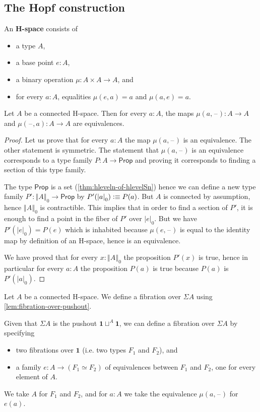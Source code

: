 \documentclass[10pt,a4paper]{article}
\providecommand{\index}[1]{}
\newcommand{\defeq}{\vcentcolon\equiv}  %
\newcommand{\define}[1]{\textbf{#1}}
\newcommand{\eqv}[2]{\ensuremath{#1 \simeq #2}\xspace}
\newcommand{\prop}{\ensuremath{\mathsf{Prop}}\xspace}
\newcommand{\trunc}[2]{\mathopen{}\left\Vert #2\right\Vert_{#1}\mathclose{}}
\newcommand{\tproj}[3][]{\mathopen{}\left|#3\right|_{#2}^{#1}\mathclose{}}
\newcommand{\unit}{\ensuremath{\mathbf{1}}\xspace}
\newcommand{\susp}{\Sigma}
\newcommand{\blank}{\mathord{\hspace{1pt}\text{--}\hspace{1pt}}}
\theoremstyle{definition}
\theoremstyle{remark}
\numberwithin{equation}{section}
\newcommand{\indexdef}[1]{\index{#1|defstyle}}   %
\begin{document}
\subsection{The Hopf construction}

\begin{defn}
  An \define{H-space}
  \indexdef{H-space}%
  consists of
  \begin{itemize}
  \item a type $A$,
  \item a base point $e:A$,
  \item a binary operation $\mu:A\times A\to A$, and
  \item for every $a:A$, equalities $\mu(e,a)=a$ and $\mu(a,e)=a$.
  \end{itemize}
\end{defn}

\begin{lem}
  Let $A$ be a connected H-space. Then for every $a:A$, the maps $\mu(a,\blank):A\to
  A$ and $\mu(\blank,a):A\to A$ are equivalences.
\end{lem}

\begin{proof}
  Let us prove that for every $a:A$ the map $\mu(a,\blank)$ is an equivalence. The
  other statement is symmetric.
  The statement that $\mu(a,\blank)$ is an equivalence corresponds to a type family
  $P:A\to\prop$ and proving it corresponds to finding a section of this type
  family.

  The type $\prop$ is a set (\cref{thm:hleveln-of-hlevelSn}) hence we can
  define a new type family $P':\trunc0A\to\prop$ by $P'(\tproj0a)\defeq
  P(a)$. But $A$ is connected by assumption, hence $\trunc0A$ is
  contractible. This implies that in order to find a section of $P'$, it is
  enough to find a point in the fiber of $P'$ over $\tproj0e$. But we have
  $P'(\tproj0e)=P(e)$ which is inhabited because $\mu(e,\blank)$ is equal to the
  identity map by definition of an H-space, hence is an equivalence.

  We have proved that for every $x:\trunc0A$ the proposition $P'(x)$ is true,
  hence in particular for every $a:A$ the proposition $P(a)$ is true because
  $P(a)$ is $P'(\tproj0a)$.
\end{proof}

\begin{defn}
  Let $A$ be a connected H-space. We define a fibration over $\susp A$ using
  \cref{lem:fibration-over-pushout}.

  Given that $\susp A$ is the pushout $\unit\sqcup^A\unit$, we can define a
  fibration over $\susp A$ by specifying
  \begin{itemize}
  \item two fibrations over $\unit$ (i.e. two types $F_1$ and $F_2$), and
  \item a family $e:A\to(\eqv{F_1}{F_2})$ of equivalences between
    $F_1$ and $F_2$, one for every element of $A$.
  \end{itemize}
  We take $A$ for $F_1$ and $F_2$, and for $a:A$ we take the equivalence
  $\mu(a,\blank)$ for $e(a)$.
\end{defn}
\end{document}
